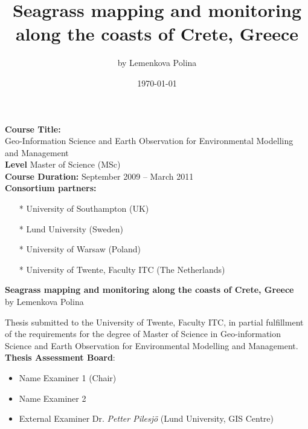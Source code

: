 \documentclass[10pt, a4paper]{article}
\begin{document}

\title{Seagrass mapping and monitoring along the coasts of Crete, Greece}
\author{by Lemenkova Polina}
\date{\today}
\maketitle
\pagebreak

\textbf{Course Title:} \\
{Geo-Information Science and Earth Observation for Environmental Modelling and Management}\\


\textbf{Level} \hfill{Master of Science (MSc)}\\
\textbf{Course Duration:} \hfill{September 2009 – March 2011}\\
\textbf{Consortium partners:} \\

\begin{itemize}
	\item[*] University of Southampton (UK)\\
	\item[*] Lund University (Sweden)\\
	\item[*] University of Warsaw (Poland)\\
	\item[*] University of Twente, Faculty ITC (The Netherlands)
\end{itemize}
\pagebreak

\begin{center}
\textbf{Seagrass mapping and monitoring along the coasts of Crete, Greece}\\
\vspace{1em}
 {by Lemenkova Polina}
\end{center}

Thesis submitted to the University of Twente, Faculty ITC, in partial fulfillment of the requirements
for the degree of Master of Science in Geo-information Science and Earth Observation for
Environmental Modelling and Management.\\

\textbf{Thesis Assessment Board}:
\begin{itemize}
	\item Name Examiner 1 (Chair)
	\item Name Examiner 2
	\item External Examiner \hfill{Dr. \textit{Petter Pilesj\"o} (Lund University, GIS Centre)}
\end{itemize}
\end{document}
